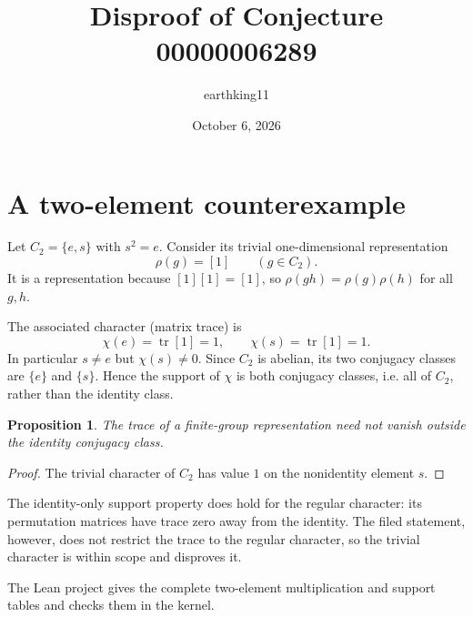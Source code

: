 \documentclass[11pt]{article}
\title{Disproof of Conjecture 00000006289}
\author{earthking11}
\date{October 6, 2026}
\newtheorem{proposition}{Proposition}
\begin{document}
\maketitle
\section*{A two-element counterexample}
Let $C_2=\{e,s\}$ with $s^2=e$.  Consider its trivial one-dimensional
representation
\[
 \rho(g)=[1]\qquad(g\in C_2).
\]
It is a representation because $[1][1]=[1]$, so
$\rho(gh)=\rho(g)\rho(h)$ for all $g,h$.

The associated character (matrix trace) is
\[
 \chi(e)=\operatorname{tr}[1]=1,
 \qquad
 \chi(s)=\operatorname{tr}[1]=1.
\]
In particular $s\ne e$ but $\chi(s)\ne0$.  Since $C_2$ is abelian, its two
conjugacy classes are $\{e\}$ and $\{s\}$.  Hence the support of $\chi$ is
both conjugacy classes, i.e. all of $C_2$, rather than the identity class.

\begin{proposition}
The trace of a finite-group representation need not vanish outside the
identity conjugacy class.
\end{proposition}
\begin{proof}
The trivial character of $C_2$ has value $1$ on the nonidentity element $s$.
\end{proof}

The identity-only support property does hold for the regular character: its
permutation matrices have trace zero away from the identity.  The filed
statement, however, does not restrict the trace to the regular character, so
the trivial character is within scope and disproves it.

The Lean project gives the complete two-element multiplication and support
tables and checks them in the kernel.
\end{document}
